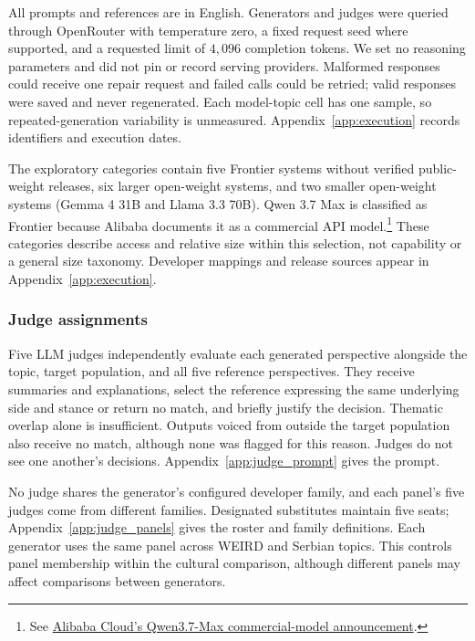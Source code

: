 \documentclass[11pt,a4paper]{article}
\begin{document}
All prompts and references are in English. Generators and judges were queried through OpenRouter with temperature zero, a fixed request seed where supported, and a requested limit of $4{,}096$ completion tokens. We set no reasoning parameters and did not pin or record serving providers. Malformed responses could receive one repair request and failed calls could be retried; valid responses were saved and never regenerated. Each model-topic cell has one sample, so repeated-generation variability is unmeasured. Appendix~\ref{app:execution} records identifiers and execution dates.

The exploratory categories contain five Frontier systems without verified public-weight releases, six larger open-weight systems, and two smaller open-weight systems (Gemma 4 31B and Llama 3.3 70B). Qwen 3.7 Max is classified as Frontier because Alibaba documents it as a commercial API model.\footnote{See \href{https://www.alibabacloud.com/en/news/product/maxcompute-model-computing-service-supports-qwen37-max-and-other-commercial-models-mkv}{Alibaba Cloud's Qwen3.7-Max commercial-model announcement}.} These categories describe access and relative size within this selection, not capability or a general size taxonomy. Developer mappings and release sources appear in Appendix~\ref{app:execution}.

\subsubsection{Judge assignments}
\label{sec:Judge evaluation}
Five LLM judges independently evaluate each generated perspective alongside the topic, target population, and all five reference perspectives. They receive summaries and explanations, select the reference expressing the same underlying side and stance or return no match, and briefly justify the decision. Thematic overlap alone is insufficient. Outputs voiced from outside the target population also receive no match, although none was flagged for this reason. Judges do not see one another's decisions. Appendix~\ref{app:judge_prompt} gives the prompt.

No judge shares the generator's configured developer family, and each panel's five judges come from different families. Designated substitutes maintain five seats; Appendix~\ref{app:judge_panels} gives the roster and family definitions. Each generator uses the same panel across WEIRD and Serbian topics. This controls panel membership within the cultural comparison, although different panels may affect comparisons between generators.
\end{document}
